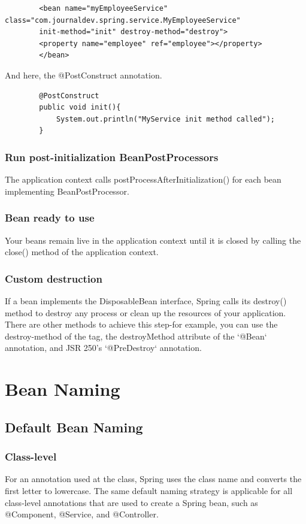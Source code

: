 \documentclass{scrartcl}
\begin{document}
    \begin{lstlisting}
        <bean name="myEmployeeService" class="com.journaldev.spring.service.MyEmployeeService"
        init-method="init" destroy-method="destroy">
        <property name="employee" ref="employee"></property>
        </bean>
    \end{lstlisting}


    And here, the @PostConstruct annotation.

    \begin{lstlisting}
        @PostConstruct
        public void init(){
            System.out.println("MyService init method called");
        }
    \end{lstlisting}


\subsubsection{Run post-initialization BeanPostProcessors}
The application context calls postProcessAfterInitialization() for each bean implementing BeanPostProcessor.

\subsubsection{Bean ready to use}
Your beans remain live in the application context until it is closed by calling the close() method of the application context.

\subsubsection{Custom destruction}
If a bean implements the DisposableBean interface, Spring calls its destroy() method to destroy any process or clean up the resources of your application. There are other methods to achieve this step-for example, you can use the destroy-method of the tag, the destroyMethod attribute of the `@Bean` annotation, and JSR 250's `@PreDestroy` annotation.


\section{Bean Naming}
\subsection{Default Bean Naming}
\subsubsection{Class-level}
For an annotation used at the class, Spring uses the class name and converts the first letter to lowercase.
The same default naming strategy is applicable for all class-level annotations that are used to create a Spring bean, such as @Component, @Service, and @Controller.
\end{document}
